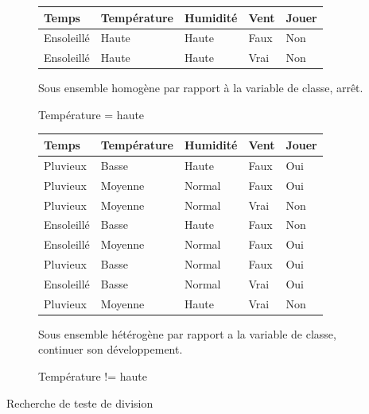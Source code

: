 \documentclass[a4paper, 11pt]{report}
\begin{document}
\begin{figure}[!h]
\caption{Température = haute}
\label{ens3}
\begin{center}
\begin{tabular}{| l | l | l | l | l |}
\hline
\rowcolor{gray!25}
Temps & Température & Humidité & Vent & Jouer \\
\hline
Ensoleillé & Haute & Haute & Faux & \cellcolor{green}Non \\
\hline
Ensoleillé & Haute & Haute & Vrai & \cellcolor{green}Non \\
\hline
\end{tabular}
\end{center}
Sous ensemble homogène par rapport à la variable de classe, arrêt.
\end{figure}
\begin{figure}[!h]
\caption{Température != haute}
\label{ens4}
\begin{center}
\begin{tabular}{| l | l | l | l | l |}
\hline
\rowcolor{gray!25}
Temps & Température & Humidité & Vent & Jouer \\
\hline
Pluvieux & Basse & Haute & Faux & \cellcolor{yellow}Oui \\
\hline
Pluvieux & Moyenne & Normal & Faux & \cellcolor{yellow}Oui \\
\hline
Pluvieux & Moyenne & Normal & Vrai &  \cellcolor{green}Non \\
\hline
Ensoleillé & Basse & Haute & Faux &  \cellcolor{green}Non \\
\hline
Ensoleillé & Moyenne & Normal & Faux &  \cellcolor{yellow}Oui \\
\hline
Pluvieux & Basse & Normal & Faux &  \cellcolor{yellow}Oui \\
\hline
Ensoleillé & Basse & Normal & Vrai &  \cellcolor{yellow}Oui \\
\hline
Pluvieux & Moyenne & Haute & Vrai &  \cellcolor{green}Non \\
\hline
\end{tabular}
\end{center}
Sous ensemble hétérogène par rapport a la variable de classe, continuer son développement.
\end{figure}

Recherche de teste de division
\end{document}
